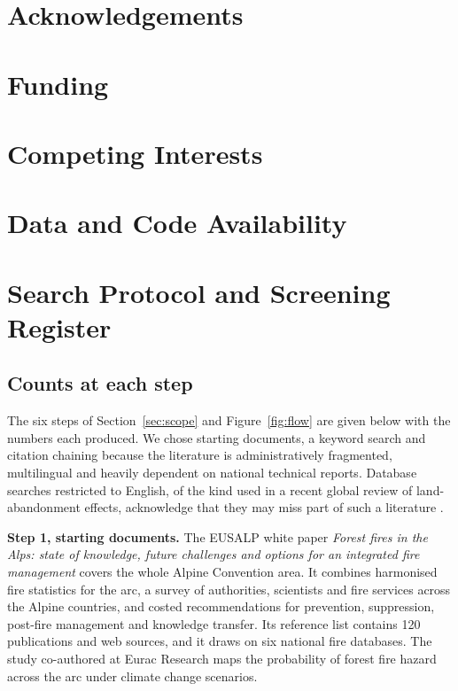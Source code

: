 \documentclass[11pt,a4paper]{article}
\begin{document}
\section*{Acknowledgements}

\section*{Funding}

\section*{Competing Interests}

\section*{Data and Code Availability}


\appendix

\section{Search Protocol and Screening Register}
\label{app:protocol}

\subsection{Counts at each step}

The six steps of Section~\ref{sec:scope} and Figure~\ref{fig:flow} are given below with the numbers each produced. We chose starting documents, a keyword search and citation chaining because the literature is administratively fragmented, multilingual and heavily dependent on national technical reports. Database searches restricted to English, of the kind used in a recent global review of land-abandonment effects, acknowledge that they may miss part of such a literature \citep{mantero_influence_2020}.

\textbf{Step 1, starting documents.} The EUSALP white paper \emph{Forest fires in the Alps: state of knowledge, future challenges and options for an integrated fire management} \citep{muller_forest_2020} covers the whole Alpine Convention area. It combines harmonised fire statistics for the arc, a survey of authorities, scientists and fire services across the Alpine countries, and costed recommendations for prevention, suppression, post-fire management and knowledge transfer. Its reference list contains 120 publications and web sources, and it draws on six national fire databases. The study co-authored at Eurac Research \citep{gerberding_mapping_2025} maps the probability of forest fire hazard across the arc under climate change scenarios.
\end{document}
